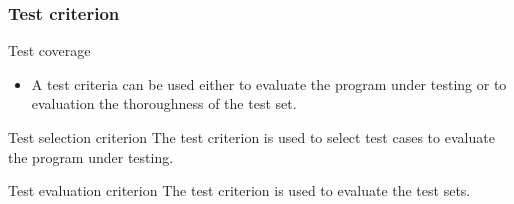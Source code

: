 \begin{frame}[hasprev=true, hasnext=false]
\frametitle{Test criterion}

\begin{block:fact}{Test coverage}
\begin{itemize}
	\item A test criteria can be used either to evaluate the program under
	testing or to evaluation the thoroughness of the test set.
\end{itemize}
\end{block:fact}

\begin{block:concept}{Test selection criterion}
The test criterion is used to select test cases to evaluate the program under
testing.
\end{block:concept}


\begin{block:concept}{Test evaluation criterion}
The test criterion is used to evaluate the test sets.
\end{block:concept}
\end{frame}



